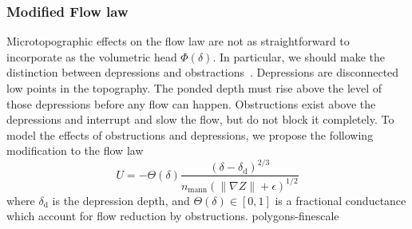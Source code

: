 \documentclass[review,11pt]{elsarticle}
\begin{document}
\subsubsection{Modified Flow law}
Microtopographic effects on the flow law are not as straightforward to incorporate as the volumetric head $\Phi(\delta)$. In particular, we should make the distinction between depressions and obstractions~\cite{panday2004fully}. Depressions are disconnected low points in the topography. The ponded depth must rise above the level of those depressions before any flow can happen. Obstructions exist above the depressions and interrupt and slow the flow, but do not block it completely.
To model the effects of obstructions and depressions, we propose the following modification to the flow law
\begin{equation}\label{modified-velocity}
U = - \Theta(\delta) \frac{(\delta - \delta_\text{d})^{2/3}}{n_\text{mann} (\| \nabla Z \| +\epsilon)^{1/2}}
\end{equation}
where $\delta_\text{d}$ is the depression depth, and $\Theta(\delta) \in [0,1]$ is a fractional conductance which account for flow reduction by obstructions.
polygons-finescale

\end{document}
